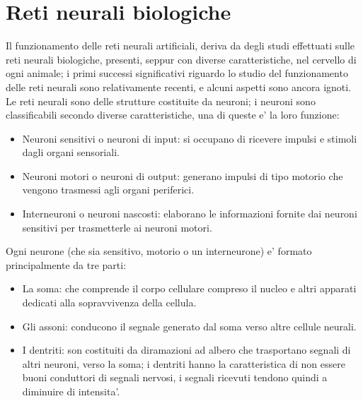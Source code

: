 \documentclass[a4paper,10pt]{report}
\begin{document}
\section{Reti neurali biologiche}
Il funzionamento delle reti neurali artificiali, deriva da degli studi effettuati
sulle reti neurali biologiche, presenti, seppur con diverse caratteristiche, 
nel cervello di ogni animale; i primi successi significativi riguardo lo studio 
del funzionamento delle reti neurali sono relativamente recenti, e alcuni aspetti
sono ancora ignoti.
Le reti neurali sono delle strutture costituite da neuroni; 
i neuroni sono classificabili secondo diverse caratteristiche, una di queste
e' la loro funzione:
\begin{itemize}
\item Neuroni sensitivi o neuroni di input: si occupano di ricevere impulsi e stimoli 
		dagli organi sensoriali.
\item Neuroni motori o neuroni di output: generano impulsi di tipo motorio che vengono
		trasmessi agli organi periferici.
\item Interneuroni o neuroni nascosti: elaborano le informazioni fornite dai neuroni 
		sensitivi per trasmetterle ai neuroni motori.
\end{itemize}

Ogni neurone (che sia sensitivo, motorio o un interneurone) e' formato 
principalmente da tre parti:
\begin{itemize}
\item La soma: che comprende il corpo cellulare compreso il nucleo e altri apparati 
		dedicati alla sopravvivenza della cellula.
 
\item Gli assoni: conducono il segnale generato dal soma verso altre cellule neurali.
 
\item I dentriti: son costituiti da diramazioni ad albero che trasportano segnali di 
		altri neuroni, verso la soma; i dentriti hanno la caratteristica di non essere 
		buoni 
		conduttori di segnali nervosi, i segnali ricevuti tendono quindi a diminuire di
		intensita'.
\end{itemize}
\end{document}
